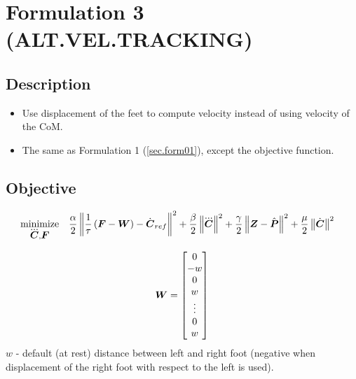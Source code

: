\section{Formulation 3 (ALT.VEL.TRACKING)}\label{sec.form03}


\subsection{Description}
\begin{itemize}
    \item Use displacement of the feet to compute velocity instead of using velocity of the CoM.
    \item The same as Formulation 1 (\ref{sec.form01}), except the objective function.
\end{itemize}



\subsection{Objective}
\begin{equation*}
\begin{split}
    \minimize{\cJerk, \FD}  & \frac{\alpha}{2} \norm{\frac{1}{\tau}\left(\FD - \V{W}\right) - \cVel_{ref}}^2 + 
                              \frac{\beta}{2} \norm{\cJerk}^2 +
                              \frac{\gamma}{2} \norm{\ZMP - \FPh}^2 +
                              \frac{\mu}{2} \norm{\cVel}^2
\end{split}
\end{equation*}

\begin{equation*}
\mbox{\boldmath $W$} = 
\begin{bmatrix}
    0 \\
    -w \\
    0 \\
    w \\
    \vdots \\
    0 \\
    w \\
\end{bmatrix}
\end{equation*}
$w$ - default (at rest) distance between left and right foot (negative when displacement of the right foot
with respect to the left is used).


